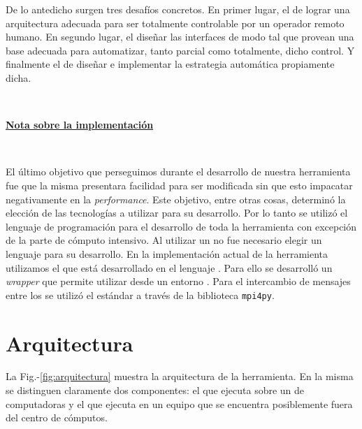 De lo antedicho surgen tres desafíos concretos. En primer lugar, el de lograr una
arquitectura adecuada para ser totalmente controlable por un operador remoto humano.
En segundo lugar, el diseñar las interfaces de modo tal que provean una base adecuada
para automatizar, tanto parcial como totalmente, dicho control. Y finalmente el de
diseñar e implementar la estrategia automática propiamente dicha.





\

\noindent\underline{\textbf{Nota sobre la implementación}}

\

El último objetivo que perseguimos durante el desarrollo de nuestra
herramienta fue que la misma presentara facilidad para ser modificada sin que
esto impacatar negativamente en la \emph{performance}. Este objetivo, entre
otras cosas, determinó la elección de las tecnologías a utilizar para su
desarrollo. Por lo tanto se utilizó el lenguaje de programación \Python para
el desarrollo de toda la herramienta con excepción de la parte de cómputo
intensivo. Al utilizar un \ssolver \ots no fue necesario elegir un lenguaje
para su desarrollo. En la implementación actual de la herramienta utilizamos
el \ssolver \minisatdosveinte que está desarrollado en el lenguaje \cpp. Para
ello se desarrolló un \emph{wrapper} que permite utilizar \minisat desde un
entorno \Python. Para el intercambio de mensajes entre los \ws se utilizó el
estándar \mpi a través de la biblioteca \texttt{mpi4py}\cite{mpi4py}.



\section{Arquitectura}

\newcommand{\fig}{Fig.-}

La \fig\ref{fig:arquitectura} muestra la arquitectura de la herramienta. En
la misma se distinguen claramente dos componentes: el \bend que ejecuta sobre
un \cluster de computadoras y el \fend que ejecuta en un equipo que se
encuentra posiblemente fuera del centro de cómputos.

